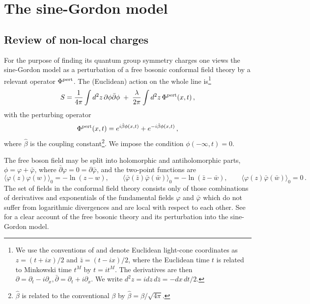 \documentclass[a4paper,12pt]{article}
\newcommand{\hb}{\hat{\beta}}
\numberwithin{equation}{section}
\begin{document}
\section{The sine-Gordon model\label{sectsgm}}



\subsection{Review of non-local charges\label{sectrnlc}}

For the purpose of finding its quantum group symmetry charges one
views the sine-Gordon model as a perturbation of a free bosonic
conformal field theory by a relevant operator $\Phi^{\rm
pert}$\cite{zam}. The (Euclidean) action on the whole line
is\footnote{We use the conventions of \cite{Ber91} and denote
Euclidean light-cone coordinates as $z=(t+ix)/2$ and
$\bar{z}=(t-ix)/2$, where the Euclidean time $t$ is related to
Minkowski time $t^M$ by $t=it^M$. The derivatives are then
$\partial=\partial_t-i\partial_x,\bar{\partial}=\partial_t+i\partial_x$.
We write $d^2z=idz\,d\bar{z}=-dx\,dt/2$.} \begin{equation} S =
\frac{1}{4\pi} \int d^2z\,\partial\phi \bar{\partial}\phi
\;+\;\frac{\lambda}{2\pi} \int d^2z\, \Phi^{\rm pert}(x,t)\,,
\end{equation} with the perturbing operator \begin{equation}
\Phi^{\rm pert}(x,t)= e^{i\hb\phi(x,t)} + e^{-i\hb\phi(x,t)}\,,
\end{equation} where $\hb$ is the coupling constant\footnote{$\hb$
is related to the conventional $\beta$ by
$\hb=\beta/\sqrt{4\pi}$.}. We impose the condition
$\phi(-\infty,t)=0$.

The free boson field may be split into holomorphic and
antiholomorphic parts, $\phi=\varphi+\bar{\varphi}$, where
$\bar{\partial}\varphi=0=\partial\bar{\varphi}$, and the two-point
functions are \begin{equation}\label{tp} \langle
\varphi(z)\varphi(w)\rangle_0=-\ln(z-w),\qquad  \langle
\bar{\varphi}(\bar{z})\bar{\varphi}(\bar{w})\rangle_0=-\ln(\bar{z}-\bar{w}),
\qquad  \langle
\varphi(z)\bar{\varphi}(\bar{w})\rangle_0=0\,.\end{equation} The
set of fields in the conformal field theory consists only of those
combinations of derivatives and exponentials of the fundamental
fields $\varphi$ and $\bar{\varphi}$ which do not suffer from
logarithmic divergences and are local with respect to each other.
See \cite{Kla92} for a clear account of the free bosonic theory
and its perturbation into the sine-Gordon model.
\end{document}

